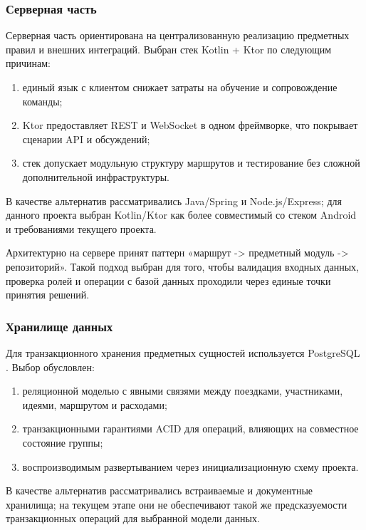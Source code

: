 \subsubsection{Серверная часть}
Серверная часть ориентирована на централизованную реализацию предметных правил и внешних интеграций. Выбран стек Kotlin + Ktor  по следующим причинам:
\begin{enumerate}
    \item единый язык с клиентом снижает затраты на обучение и сопровождение команды;
    \item Ktor предоставляет REST и WebSocket в одном фреймворке, что покрывает сценарии API и обсуждений;
    \item стек допускает модульную структуру маршрутов и тестирование без сложной дополнительной инфраструктуры.
\end{enumerate}

В качестве альтернатив рассматривались Java/Spring и Node.js/Express; для данного проекта выбран Kotlin/Ktor как более совместимый со стеком Android и требованиями текущего проекта.

Архитектурно на сервере принят паттерн «маршрут -> предметный модуль -> репозиторий». Такой подход выбран для того, чтобы валидация входных данных, проверка ролей и операции с базой данных проходили через единые точки принятия решений.

\subsubsection{Хранилище данных}
Для транзакционного хранения предметных сущностей используется PostgreSQL . Выбор обусловлен:
\begin{enumerate}
    \item реляционной моделью с явными связями между поездками, участниками, идеями, маршрутом и расходами;
    \item транзакционными гарантиями ACID для операций, влияющих на совместное состояние группы;
    \item воспроизводимым развертыванием через инициализационную схему проекта.
\end{enumerate}

В качестве альтернатив рассматривались встраиваемые и документные хранилища; на текущем этапе они не обеспечивают такой же предсказуемости транзакционных операций для выбранной модели данных.

